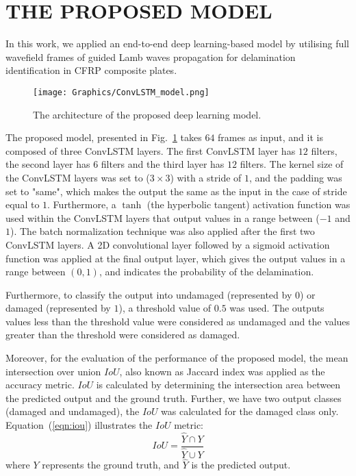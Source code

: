 \documentclass{IOS-Book-Article}
\begin{document}
\section{THE PROPOSED MODEL}\label{sec:section4}
In this work, we applied an end-to-end deep learning-based model by utilising 
full wavefield frames of guided Lamb waves propagation for delamination 
identification in CFRP composite plates.
\begin{figure} [h!]
	\begin{center}
		\texttt{[image: Graphics/ConvLSTM\_model.png]}
	\end{center}
	\caption{The architecture of the proposed deep learning model.} 
	\label{fig:proposed_models}
\end{figure}
The proposed model, presented in Fig.~\ref{fig:proposed_models} takes 
\(64\) frames as input, and it is composed of three ConvLSTM layers.
The first ConvLSTM layer has \(12\) filters, the second layer has \(6\) 
filters and the third layer has \(12\) filters.
The kernel size of the ConvLSTM layers was set to (\(3\times3\)) with a stride 
of \(1\), and the padding was set to "same", which makes the output the same 
as the input in the case of stride equal to \(1\).
Furthermore, a \(\tanh\) (the hyperbolic tangent) activation function was used 
within the ConvLSTM layers that output values in a range between (\(-1\) and 
\(1\)). The batch normalization technique was also applied after the first two 
ConvLSTM layers.
A 2D convolutional layer followed by a sigmoid activation function was applied 
at the final output layer, which gives the output values in a range between 
\((0,1)\), and indicates the probability of the delamination.

Furthermore, to classify the output into undamaged (represented by \(0\)) or 
damaged (represented by \(1\)), a threshold value of \(0.5\) was used. 
The outputs values less than the threshold value were considered as undamaged 
and the values greater than the threshold were considered as damaged.

Moreover, for the evaluation of the performance of the proposed model, the mean 
intersection over union \(IoU\), also known as Jaccard index was applied as the 
accuracy metric. 
\(IoU\) is calculated by determining the intersection area between the 
predicted output and the ground truth. 
Further, we have two output classes (damaged and undamaged), the \(IoU\) was 
calculated for the damaged class only. 
Equation~(\ref{eqn:iou}) illustrates the \(IoU\) metric: 
\begin{equation}
	IoU=\frac{\hat{Y} \cap Y}{\hat{Y} \cup Y}
	\label{eqn:iou}
\end{equation}
where \(Y\) represents the ground truth, and \(\hat{Y}\) is the predicted 
output.
\end{document}
